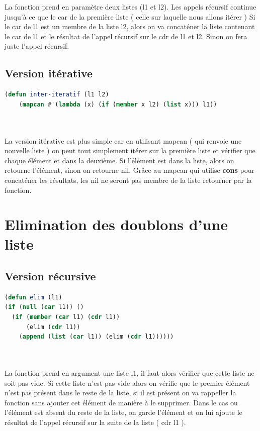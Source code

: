 \documentclass[a4paper,10pt]{report}
\begin{document}
      La fonction prend en paramètre deux listes (l1 et l2). Les appels récursif continue jusqu'à ce que le car de la première liste ( celle sur laquelle nous allons itérer )
      Si le car de l1 est un membre de la liste l2, alors on va concaténer la liste contenant le car de l1 et le résultat de l'appel récursif sur le cdr de l1 et l2. Sinon
      on fera juste l'appel récursif. \newline
      
      
      \subsection{Version itérative}
      
	\begin{lstlisting}[language=Lisp]
(defun inter-iteratif (l1 l2)
    (mapcan #'(lambda (x) (if (member x l2) (list x))) l1))

    
    \end{lstlisting}

      La version itérative est plus simple car en utilisant mapcan ( qui renvoie une nouvelle liste ) on peut tout simplement itérer sur la première liste et vérifier que chaque élément et dans la deuxième.
      Si l'élément est dans la liste, alors on retourne l'élément, sinon on retourne nil. Grâce au mapcan qui utilise \textbf{cons} pour concaténer les résultats, les nil ne seront pas membre de la liste retourner par la fonction.
      \vspace{1cm}
       \section{Elimination des doublons d'une liste}
      \subsection{Version récursive}
	\begin{lstlisting}[language=Lisp]
(defun elim (l1)
(if (null (car l1)) ()
  (if (member (car l1) (cdr l1))
      (elim (cdr l1))
    (append (list (car l1)) (elim (cdr l1))))))
	
	
	\end{lstlisting}
      
      La fonction prend en argument une liste l1, il faut alors vérifier que cette liste ne soit pas vide. Si cette liste n'est pas vide alors on vérifie que le premier élément
      n'est pas présent dans le reste de la liste, si il est présent on va rappeller la fonction sans ajouter cet élément de manière à le supprimer. Dans le cas ou l'élément
      est absent du reste de la liste, on garde l'élément et on lui ajoute le résultat de l'appel récursif sur la suite de la liste ( cdr l1 ).
      \newpage
\end{document}

